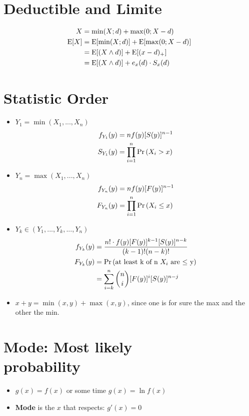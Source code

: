 \documentclass[10pt, french]{article}
\begin{document}
\begin{multicols*}{3}
\section*{Deductible and Limite}
\begin{align*}
    X &= \min(X;d) + \max(0;X-d) \\
    \mathrm{E} {\left[ X \right]} &= \mathrm{E} {\left[ \min(X;d) \right]} + \mathrm{E} {\left[ \max(0;X-d) \right]} \\
            &= \mathrm{E} {\left[ (X \wedge d) \right]} + \mathrm{E} {\left[ (x-d)_{+} \right]} \\
            &= \mathrm{E} {\left[ (X \wedge d) \right]} + e_x(d)\cdot S_x(d)
\end{align*}

\section*{Statistic Order}
\label{Appendix: Statistic Order}
\begin{itemize}[align=left,leftmargin=*]
    \item $Y_1 = \min(X_1, ... ,X_n)$
    \begin{align*}
        f_{Y_1}(y) &= nf(y)[S(y)]^{n-1} \\
        S_{Y_1}(y) &= \prod_{i=1}^n \Pr \left( X_i>x \right)
    \end{align*}
    \item $Y_n = \max(X_1, ... ,X_n)$
    \begin{align*}
        f_{Y_n}(y) &= nf(y)[F(y)]^{n-1} \\
        F_{Y_n}(y) &= \prod_{i=1}^n \Pr \left( X_i\leq x \right)
    \end{align*}
    \item $Y_k \in (Y_1,...,Y_k,...,Y_n)$
    \begin{align*}
        f_{Y_k}(y) &= \frac{n!\cdot f(y)[F(y)]^{k-1}[S(y)]^{n-k}}{(k-1)!(n-k)!} \\
        F_{Y_k}(y) &= \Pr \left( \text{at least k of n $X_i$ are $\leq$ y} \right) \\
                   &= \sum_{i=k}^n \binom{n}{i} [F(y)]^i[S(y)]^{n-j}
    \end{align*}
    \item $x+y=\min(x,y)+\max(x,y)$, since one is for sure the max and the other the min.
\end{itemize}

\section*{Mode: Most likely \\ probability}
\begin{itemize}[align=left,leftmargin=*]
    \item $g(x) = f(x)$ or some time $g(x) = \ln f(x)$
    \item \textbf{Mode} is the $x$ that respects: $g'(x) = 0$
\end{itemize}


\end{multicols*}
\end{document}
